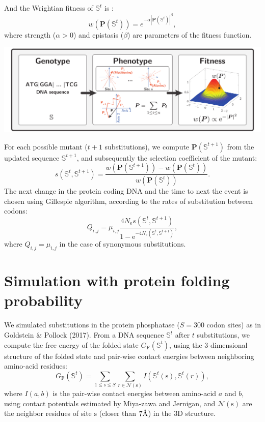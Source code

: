 \documentclass{article}
\newcommand{\e}{\mathrm{e}}
\newcommand{\angstrom}{\text{\normalfont\AA}}
\newcommand{\Ne}{N_{\mathrm{e}}}
\newcommand{\Nsite}{S}
\newcommand{\site}{\text{s}}
\newcommand{\ci}{{i}}
\newcommand{\cj}{{j}}
\newcommand{\itoj}{\ci, \cj}
\newcommand{\submatrix}{Q}
\newcommand{\phenoGeo}{\bm{P}}
\begin{document}
And the Wrightian fitness of $\mathbb{S}^t$ is : 
\begin{equation}
w\left( \phenoGeo\left(\mathbb{S}^{t}\right) \right) = e^{-\alpha \left| \phenoGeo\left(\mathbb{S}^{t}\right) \right|^{\beta}},
\end{equation}
where strength ($\alpha > 0$) and epistasis ($\beta$) are parameters of the fitness function.
\begin{center}
	\includegraphics[width=165mm] {artworks/ModelSimuGeo.pdf}
\end{center}
For each possible mutant ($t+1$ substitutions), we compute $\phenoGeo\left(\mathbb{S}^{t+1}\right)$ from the updated sequence $\mathbb{S}^{t+1}$, and subsequently the selection coefficient of the mutant:
\begin{equation}
s \left( \mathbb{S}^{t},\mathbb{S}^{t+1}\right) = \dfrac{ w\left( \phenoGeo\left(\mathbb{S}^{t+1}\right) \right) - w\left( \phenoGeo\left(\mathbb{S}^{t}\right) \right)}{w\left( \phenoGeo\left(\mathbb{S}^{t}\right) \right)}.
\end{equation}
The next change in the protein coding DNA and the time to next the event is chosen using Gillespie algorithm, according to the rates of substitution between codons:
\begin{equation}
{\submatrix_{\itoj}} = \mu_{\itoj} \dfrac{4 \Ne s \left( \mathbb{S}^{t},\mathbb{S}^{t+1}\right)}{{1 - \e^{-4 \Ne \left( \mathbb{S}^{t},\mathbb{S}^{t+1}\right)} }}, 
\end{equation}
where ${\submatrix_{\itoj}} = \mu_{\itoj}$ in the case of synonymous substitutions.

\section{Simulation with protein folding probability}
We simulated substitutions in the protein phosphatase ($\Nsite=300$ codon sites) as in Goldstein \& Pollock (2017).
From a DNA sequence $\mathbb{S}^t$ after $t$ substitutions, we compute the free energy of the folded state $G_{\mathrm{F}}\left(\mathbb{S}^{t}\right)$, using the $3$-dimensional structure of the folded state and pair-wise contact energies between neighboring amino-acid residues:
\begin{equation}
G_{\mathrm{F}}\left(\mathbb{S}^{t}\right) = \sum_{1 \leq \site \leq \Nsite} \sum_{r \in \mathcal{N}(\site)} I \left(\mathbb{S}^t(\site), \mathbb{S}^t(r) \right),
\end{equation}
where $I(a,b)$ is the pair-wise contact energies between amino-acid $a$ and $b$, using contact potentials estimated by Miya-zawa and Jernigan, and $\mathcal{N}(\site)$ are the neighbor residues of site $\site$ (closer than $7\angstrom$) in the $3$D structure.\\
\end{document}
